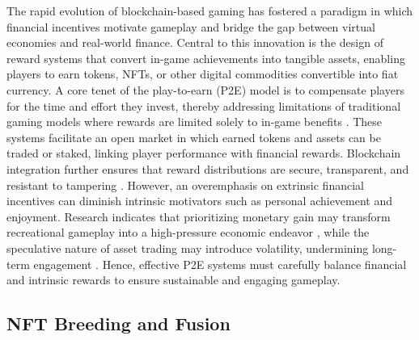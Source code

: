 The rapid evolution of blockchain-based gaming has fostered a paradigm in which
financial incentives motivate gameplay and bridge the gap between virtual
economies and real-world finance. Central to this innovation is the design of
reward systems that convert in-game achievements into tangible assets, enabling
players to earn tokens, NFTs, or other digital commodities convertible into fiat
currency. A core tenet of the play-to-earn (P2E) model is to compensate players
for the time and effort they invest, thereby addressing limitations of
traditional gaming models where rewards are limited solely to in-game benefits
\cite{delfabbroUnderstandingMechanicsConsumer2022}. These systems facilitate an
open market in which earned tokens and assets can be traded or staked, linking
player performance with financial rewards. Blockchain integration further
ensures that reward distributions are secure, transparent, and resistant to
tampering \cite{duguleanaEmergingTrendsPlaytoEarn2024,
	shazhaevPlaytoHashEconomicsMetaverses2022}. However, an overemphasis on
extrinsic financial incentives can diminish intrinsic motivators such as
personal achievement and enjoyment. Research indicates that prioritizing
monetary gain may transform recreational gameplay into a high-pressure economic
endeavor \cite{delicProfilingPotentialRisks2024}, while the speculative nature
of asset trading may introduce volatility, undermining long-term engagement
\cite{leeExaminingConsumerMotivations2023,
	delfabbroUnderstandingMechanicsConsumer2022}. Hence, effective P2E systems must
carefully balance financial and intrinsic rewards to ensure sustainable and
engaging gameplay.

\subsection{NFT Breeding and Fusion}

